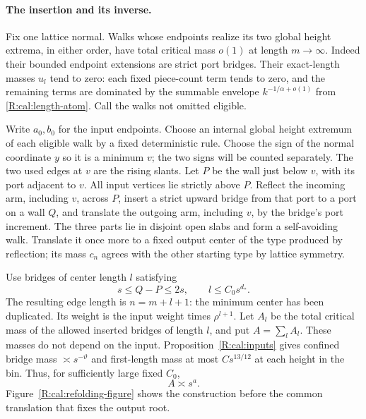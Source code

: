 \paragraph{The insertion and its inverse.}
Fix one lattice normal. Walks whose endpoints realize its two global
height extrema, in either order, have total critical mass $o(1)$ at
length $m\to\infty$. Indeed their bounded endpoint extensions are strict
port bridges. Their exact-length masses $u_l$ tend to zero: each fixed
piece-count term tends to zero, and the remaining terms are dominated
by the summable envelope $k^{-1/\alpha+o(1)}$ from
\eqref{R:cal:length-atom}. Call the walks not omitted eligible.

Write $a_0,b_0$ for the input endpoints. Choose an internal global height
extremum of each eligible walk by a fixed deterministic rule. Choose the sign of the normal coordinate $y$
so it is a minimum $v$; the two signs will be counted separately. The
two used edges at $v$ are the rising slants. Let $P$ be the wall just
below $v$, with its port adjacent to $v$. All input vertices lie
strictly above $P$. Reflect the incoming arm, including $v$, across
$P$, insert a strict upward bridge from that port to a port on a wall
$Q$, and translate the outgoing arm, including $v$, by the bridge's
port increment. The three parts lie in disjoint open slabs and form a
self-avoiding walk. Translate it once more to a fixed output center of
the type produced by reflection; its mass $c_n$ agrees with the other
starting type by lattice symmetry.

Use bridges of center length $l$ satisfying
\[
 s\le Q-P\le2s,\qquad l\le C_0s^{d_*}.
\]
The resulting edge length is $n=m+l+1$: the minimum center has been
duplicated. Its weight is the input weight times $\rho^{l+1}$. Let
$A_l$ be the total critical mass of the allowed inserted bridges of
length $l$, and put $A=\sum_l A_l$. These masses do not depend on the
input. Proposition~\ref{R:cal:inputs} gives confined bridge mass
$\asymp s^{-\vartheta}$ and first-length mass at most $Cs^{13/12}$
at each height in the bin. Thus, for sufficiently large fixed $C_0$,
\[
 A\asymp s^a.
\]
Figure~\ref{R:cal:refolding-figure} shows the construction before the
common translation that fixes the output root.

